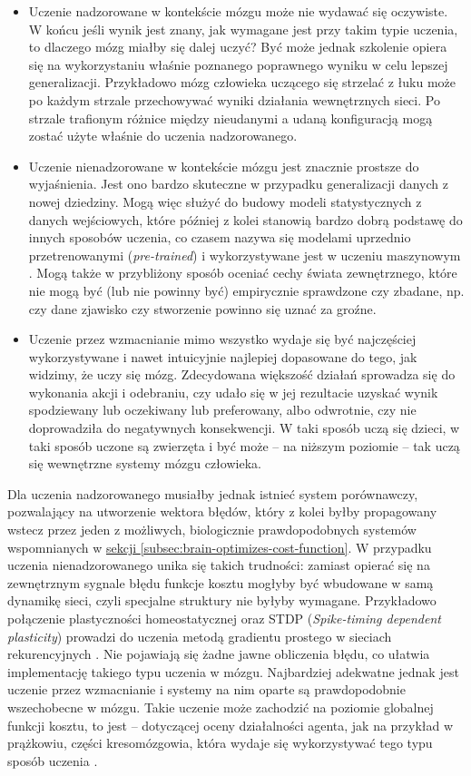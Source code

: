 \begin{itemize}
	\item Uczenie nadzorowane w kontekście mózgu może nie wydawać się oczywiste.
	      W końcu jeśli wynik jest znany, jak wymagane jest przy takim typie uczenia, to dlaczego mózg miałby się dalej uczyć?
	      Być może jednak szkolenie opiera się na wykorzystaniu właśnie poznanego poprawnego wyniku w celu lepszej generalizacji.
	      Przykładowo mózg człowieka uczącego się strzelać z łuku może po każdym strzale przechowywać wyniki działania wewnętrznych sieci.
	      Po strzale trafionym różnice między nieudanymi a udaną konfiguracją mogą zostać użyte właśnie do uczenia nadzorowanego.
	\item Uczenie nienadzorowane w kontekście mózgu jest znacznie prostsze do wyjaśnienia.
	      Jest ono bardzo skuteczne w przypadku generalizacji danych z nowej dziedziny.
	      Mogą więc służyć do budowy modeli statystycznych z danych wejściowych, które później z kolei stanowią bardzo dobrą podstawę do innych sposobów uczenia, co czasem nazywa się modelami uprzednio przetrenowanymi (\emph{pre-trained}) i wykorzystywane jest w uczeniu maszynowym \cite{erhan2009difficulty}.
	      Mogą także w przybliżony sposób oceniać cechy świata zewnętrznego, które nie mogą być (lub nie powinny być) empirycznie sprawdzone czy zbadane, np. czy dane zjawisko czy stworzenie powinno się uznać za groźne.
	\item Uczenie przez wzmacnianie mimo wszystko wydaje się być najczęściej wykorzystywane i nawet intuicyjnie najlepiej dopasowane do tego, jak widzimy, że uczy się mózg.
	      Zdecydowana większość działań sprowadza się do wykonania akcji i odebraniu, czy udało się w jej rezultacie uzyskać wynik spodziewany lub oczekiwany lub preferowany, albo odwrotnie, czy nie doprowadziła do negatywnych konsekwencji.
	      W taki sposób uczą się dzieci, w taki sposób uczone są zwierzęta i być może -- na niższym poziomie -- tak uczą się wewnętrzne systemy mózgu człowieka.
\end{itemize}

Dla uczenia nadzorowanego musiałby jednak istnieć system porównawczy, pozwalający na utworzenie wektora błędów, który z kolei byłby propagowany wstecz przez jeden z możliwych, biologicznie prawdopodobnych systemów wspomnianych w \hyperref[subsec:brain-optimizes-cost-function]{sekcji \ref*{subsec:brain-optimizes-cost-function}}.
W przypadku uczenia nienadzorowanego unika się takich trudności: zamiast opierać się na zewnętrznym sygnale błędu funkcje kosztu mogłyby być wbudowane w samą dynamikę sieci, czyli specjalne struktury nie byłyby wymagane.
Przykładowo połączenie plastyczności homeostatycznej oraz STDP (\emph{Spike-timing dependent plasticity}) prowadzi do uczenia metodą gradientu prostego w sieciach rekurencyjnych \cite{galtier2013biological}.
Nie pojawiają się żadne jawne obliczenia błędu, co ułatwia implementację takiego typu uczenia w mózgu.
Najbardziej adekwatne jednak jest uczenie przez wzmacnianie i systemy na nim oparte są prawdopodobnie wszechobecne w mózgu.
Takie uczenie może zachodzić na poziomie globalnej funkcji kosztu, to jest -- dotyczącej oceny działalności agenta, jak na przykład w prążkowiu, części kresomózgowia, która wydaje się wykorzystywać tego typu sposób uczenia \cite{o2014goal}.

